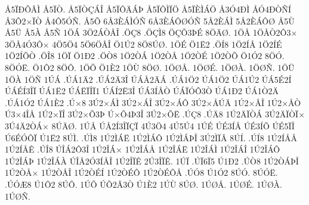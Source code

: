{^^c55^^cf^^d0^^d5^^c2^^cc
^^c55^^cf^^d2.
^^c55^^cf^^d2^^c7^^c1^^ce
^^c55^^cf^^d4^^c4^^c1^^de
^^c55^^cf^^d4^^cc^^cf^^d6
^^c55^^cf^^c8^^cc^^c1^^d6
^^c53^^d34^^d0^^cc
^^c5^^d34^^d0^^d2^^d1^^cd
^^c53^^d42^^d7^^cf^^d2
^^c54^^d45^^d3^^d1.
^^c55^^d5
6^^c53^^c8^^c1^^cc^^d3^^d1
6^^c53^^c8^^c1^^d4^^d8^^d3^^d1
5^^c52^^c8^^c1^^cc
5^^c52^^c8^^c1^^d4^^d8
^^c55^^d9
^^c55^^dc
^^c55^^c0
^^c55^^d1
1^^d6^^c1
3^^d62^^c1^^d2^^c5^^ce
.^^d6^^c78
.^^d6^^c7^^cc8
^^d6^^c7^^d53^^de^^c9
8^^d6^^c4^^d8.
1^^d6^^c5
1^^d6^^c5^^d22^^d43^^d7
3^^d6^^c54^^d33^^d4^^d7
4^^d65^^d64
5^^d66^^d6^^c5^^ce
^^d61^^da2
8^^d68^^da^^d8.
1^^d6^^c9
^^d61^^cb2
.^^d6^^cd8
1^^d62^^cd^^c5
1^^d62^^cd^^c9
1^^d62^^cd^^d5^^d2
.^^d6^^ce8
1^^d6^^cf
^^d61^^d02
.^^d6^^d28
1^^d62^^d2^^c1
1^^d62^^d2^^c5
1^^d62^^d2^^c9
1^^d62^^d2^^d5
^^d61^^d32
8^^d6^^d3.
8^^d6^^d3^^cb.
^^d61^^d42
8^^d6^^d4.
1^^d6^^d5
^^d61^^c82
1^^d6^^d9
8^^d6^^d8.
1^^d6^^d8^^c5.
1^^d6^^d8^^c9.
1^^d6^^d8^^c0.
1^^d6^^d8^^d1.
1^^d6^^dc
1^^d6^^c0
1^^d6^^d1
1^^da^^c1
.^^da^^c11^^c42
.^^da^^c12^^c43^^ce
^^da^^c1^^c52^^c4^^c1
.^^da^^c11^^d62
^^da^^c11^^d62
^^da^^c11^^da2
^^da^^c15^^c92^^cd
^^da^^c1^^c9^^cd3^^ce^^cf
^^da^^c11^^cb2
^^da^^c1^^cb^^cf^^ce^^cf1
^^da^^c1^^cd2^^cb3^^ce
^^da^^c13^^cd^^c5^^d2
^^da^^c1^^cf^^d3^^d43^^d2
^^da^^c11^^d02
^^da^^c11^^d22^^c4
.^^da^^c11^^d32
^^da^^c11^^c82
.^^da^^d78
3^^da2^^d7^^c1^^cc
3^^da2^^d7^^c1^^ce
3^^da2^^d7^^c1^^d4
3^^da2^^d7^^c5^^da^^c4
1^^da2^^d7^^c5^^ce
1^^da2^^d7^^c5^^d2
^^da3^^d74^^ce^^c5
1^^da2^^d7^^cf^^ce
3^^da2^^d7^^d53^^de
^^da^^d7^^d54^^de3^^ce
3^^da2^^d7^^d5^^cb
.^^da^^c78
.^^da^^c48
1^^da2^^c4^^cf^^d2^^c1
3^^da2^^c4^^cf^^d2^^cf^^d7
3^^da4^^c42^^d2^^c1^^d7
8^^da^^c4^^d8.
1^^da^^c5
^^da^^c52^^cd3^^ce^^cf^^c7^^cf
4^^da3^^d64
4^^da5^^da4
1^^da^^c9
^^da^^c93^^cd^^c5
^^da^^c93^^cd^^d5
^^da^^c95^^cf^^ce
^^da6^^c9^^d3^^d4^^cf
^^da1^^cb2
8^^da^^cc.
.^^da^^cc8
1^^da2^^cc^^c1^^cb
1^^da2^^cc^^c1^^d4
1^^da2^^cc^^c1^^de^^ce
3^^da2^^cc^^cf^^c2
8^^da^^cd.
.^^da^^cd8
1^^da2^^cd^^c5^^c5
1^^da2^^cd^^c5^^ca
.^^da^^ce8
^^da^^ce^^c12^^d43^^ce
1^^da2^^ce^^c1^^d7
1^^da2^^ce^^c1^^c5
1^^da2^^ce^^c1^^cb
1^^da2^^ce^^c1^^cc
1^^da2^^ce^^c1^^ce
1^^da2^^ce^^c1^^d4
1^^da2^^ce^^c1^^de
1^^da2^^ce^^c1^^c0
^^da^^ce^^c52^^d33^^cd^^c5^^ce
1^^da2^^ce^^cf^^ca
2^^da3^^ce^^cf^^ca.
1^^da^^cf
.^^da^^cf6^^cf5
^^da1^^d02
.^^da^^d28
1^^da2^^d2^^c1^^de^^ce
1^^da2^^d2^^c5^^d7
1^^da2^^d2^^c5^^ce
1^^da2^^d2^^c9^^cd
1^^da2^^d2^^c9^^d4
1^^da2^^d2^^c9^^d4^^c5
.^^da^^d38
^^da1^^d32
8^^da^^d3.
8^^da^^d3^^cb.
.^^da^^d3^^c68
^^da1^^d42
8^^da^^d4.
1^^da^^d5
^^da^^d52^^c23^^d2
^^da1^^c82
1^^da^^d9
8^^da^^d8.
1^^da^^d8^^c5.
1^^da^^d8^^c9.
1^^da^^d8^^c0.
1^^da^^d8^^d1.
}
